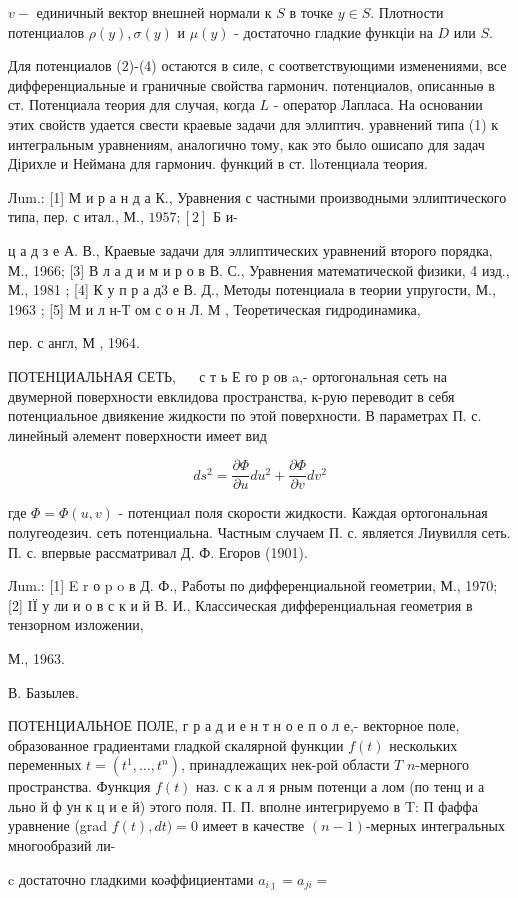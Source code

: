 \documentclass[10pt]{article}
\begin{document}
$v-$ единичный вектор внешней нормали к $S$ в точке $y \in S$. Плотности потенциалов $\rho(y), \sigma(y)$ и $\mu(y)$ - достаточно гладкие функціи на $D$ или $S$.



Для потенциалов (2)-(4) остаются в силе, с соответствующими изменениями, все дифференциальные и граничные свойства гармонич. потенциалов, описанныө в ст. Потенциала теория для случая, когда $L$ - оператор Лапласа. На основании этих свойств удается свести краевые задачи для эллиптич. уравнений типа (1) к интегральным уравнениям, аналогично тому, как это было ошисапо для задач Дірихле и Неймана для гармонич. функций в ст. lloтенциала теория.



Лum.: [1] М и р а н д а К., Уравнения с частными производными эллиптического типа, пер. с итал., М., $1957 ;[2]$ Б и-

ц а д з е А. В., Краевые задачи для эллиптических уравнений второго порядка, М., 1966; [3] В л а д и м и р о в В. С., Уравнения математической физики, 4 изд., М., 1981 ; [4] К у п р а д3 е В. Д., Методы потенциала в теории упругости, М., 1963 ; [5] М и л н-Т ом с о н Л. М , Теоретическая гидродинамика,

пер. с англ, М , 1964.



ПОТЕНЦИАЛЬНАЯ СЕТЬ, $\quad$ с т ь Е го р ов a,- ортогональная сеть на двумерной поверхности евклидова пространства, к-рую переводит в себя потенциальное двиякение жидкости по этой поверхности. В параметрах П. с. линейный әлемент поверхности имеет вид



\[

d s^{2}=\frac{\partial \Phi}{\partial u} d u^{2}+\frac{\partial \Phi}{\partial v} d v^{2}

\]



где $\Phi=\Phi(u, v)$ - потенциал поля скорости жидкости. Каждая ортогональная полугеодезич. сеть потенциальна. Частным случаем П. с. является Лиувилля сеть. П. с. впервые рассматривал Д. Ф. Егоров (1901).



Лum.: [1] E r о p o в Д. Ф., Работы по дифференциальной геометрии, М., 1970; [2] IÏ у ли и о в с к и й В. И., Классическая дифференциальная геометрия в тензорном изложении,

М., 1963.

В. Базылев.



ПОТЕНЦИАЛЬНОЕ ПОЛЕ, г р а д и е н т н о е п о л е,- векторное поле, образованное градиентами гладкой скалярной функции $f(t)$ нескольких переменных $t=\left(t^{1}, \ldots, t^{n}\right)$, принадлежащих нек-рой области $T$ $n$-мерного пространства. Функция $f(t)$ наз. с к а л я рным потенци а лом (по тенц и а льно й ф ун к ц и е й) этого поля. П. П. вполне интегрируемо в T: П фаффа уравнение (grad $f(t), d t)=0$ имеет в качестве $(n-1)$-мерных интегральных многообразий ли-



c достаточно гладкими коәффициентами $a_{i \jmath}=a_{j i}=$
\end{document}

